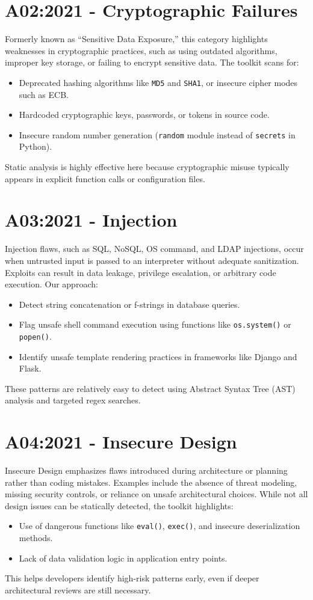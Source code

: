 \section{A02:2021 - Cryptographic Failures}
Formerly known as ``Sensitive Data Exposure,'' this category highlights weaknesses in cryptographic practices, such as using outdated algorithms, improper key storage, or failing to encrypt sensitive data.
The toolkit scans for:
\begin{itemize}
    \item Deprecated hashing algorithms like \texttt{MD5} and \texttt{SHA1}, or insecure cipher modes such as ECB.
    \item Hardcoded cryptographic keys, passwords, or tokens in source code.
    \item Insecure random number generation (\texttt{random} module instead of \texttt{secrets} in Python).
\end{itemize}
Static analysis is highly effective here because cryptographic misuse typically appears in explicit function calls or configuration files.

\section{A03:2021 - Injection}
Injection flaws, such as SQL, NoSQL, OS command, and LDAP injections, occur when untrusted input is passed to an interpreter without adequate sanitization. Exploits can result in data leakage, privilege escalation, or arbitrary code execution.
Our approach:
\begin{itemize}
    \item Detect string concatenation or f-strings in database queries.
    \item Flag unsafe shell command execution using functions like \texttt{os.system()} or \texttt{popen()}.
    \item Identify unsafe template rendering practices in frameworks like Django and Flask.
\end{itemize}
These patterns are relatively easy to detect using Abstract Syntax Tree (AST) analysis and targeted regex searches.

\section{A04:2021 - Insecure Design}
Insecure Design emphasizes flaws introduced during architecture or planning rather than coding mistakes. Examples include the absence of threat modeling, missing security controls, or reliance on unsafe architectural choices.
While not all design issues can be statically detected, the toolkit highlights:
\begin{itemize}
    \item Use of dangerous functions like \texttt{eval()}, \texttt{exec()}, and insecure deserialization methods.
    \item Lack of data validation logic in application entry points.
\end{itemize}
This helps developers identify high-risk patterns early, even if deeper architectural reviews are still necessary.


